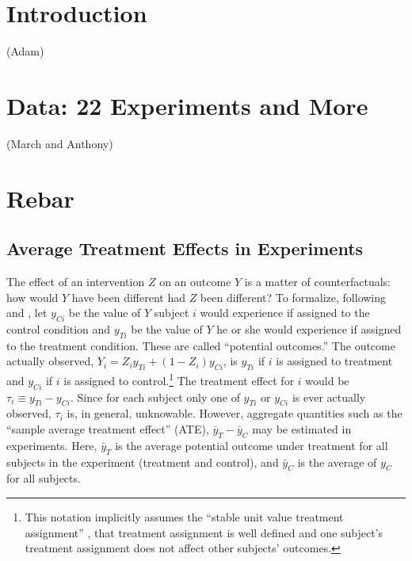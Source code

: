 \documentclass{edm_template}
\newcommand{\yti}{y_{Ti}}
\newcommand{\yci}{y_{Ci}}
\begin{document}
\section{Introduction}
(Adam)

\section{Data: 22 Experiments and More}
(March and Anthony)

\section{Rebar}
\subsection{Average Treatment Effects in Experiments}
The effect of an intervention $Z$ on an outcome $Y$ is a matter of counterfactuals: how would $Y$ have been different had $Z$ been different? 
To formalize, following  and , let $\yci$ be the value of $Y$ subject $i$ would experience if assigned to the control condition and $\yti$ be the value of $Y$ he or she would experience if assigned to the treatment condition. These are called ``potential outcomes.'' The outcome actually observed, $Y_i=Z_i\yti+(1-Z_i)\yci$, is $\yti$ if $i$ is assigned to treatment and $\yci$ if $i$ is assigned to control.\footnote{This notation implicitly assumes the ``stable unit value treatment assignment'' \cite{sutva}, that treatment assignment is well defined and one subject's treatment assignment does not affect other subjects' outcomes.} The treatment effect for $i$ would be $\tau_i\equiv \yti-\yci$. Since for each subject only one of $\yti$ or $\yci$ is ever actually observed, $\tau_i$ is, in general, unknowable. However, aggregate quantities such as the ``sample average treatment effect'' (ATE), $\bar{y}_T-\bar{y}_C$ may be estimated in experiments. Here, $\bar{y}_T$ is the average potential outcome under treatment for all subjects in the experiment (treatment and control), and $\bar{y}_C$ is the average of $y_C$ for all subjects.
\end{document}
